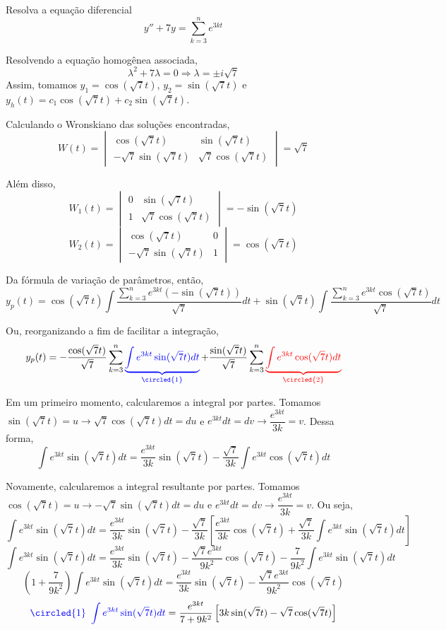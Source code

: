 \documentclass[oneside,12pt,a4paper]{report}
\begin{document}
\exercicio[] Resolva a equação diferencial
\[y''+7y=\sum_{k=3}^{n}e^{3kt}\]

\begin{resolucao}
    Resolvendo a equação homogênea associada,
    \[\lambda^2+7\lambda=0\Rightarrow\lambda=\pm i\sqrt{7}\]
    Assim, tomamos $y_1=\cos(\sqrt{7}t)$, $y_2=\sin(\sqrt{7}t)$ e $y_h(t)=c_1\cos(\sqrt{7}t)+c_2\sin(\sqrt{7}t)$.

    Calculando o Wronskiano das soluções encontradas,
    \[W(t)=\begin{vmatrix}
        \cos(\sqrt{7}t)          & \sin(\sqrt{7}t)\\
        -\sqrt{7}\sin(\sqrt{7}t) & \sqrt{7}\cos(\sqrt{7}t)
    \end{vmatrix}=\sqrt{7}\]

    Além disso,
    \[W_1(t)=\begin{vmatrix}
        0 & \sin(\sqrt{7}t)\\
        1 & \sqrt{7}\cos(\sqrt{7}t)
    \end{vmatrix}=-\sin(\sqrt{7}t)\]
    \[W_2(t)=\begin{vmatrix}
        \cos(\sqrt{7}t)          & 0\\
        -\sqrt{7}\sin(\sqrt{7}t) & 1
    \end{vmatrix}=\cos(\sqrt{7}t)\]

    Da fórmula de variação de parâmetros, então,
    \[ y_p(t)=\cos(\sqrt{7}t)\int\frac{\sum_{k=3}^{n}e^{3kt}(-\sin(\sqrt{7}t))}{\sqrt{7}}dt+\sin(\sqrt{7}t)\int\frac{\sum_{k=3}^{n}e^{3kt}\cos(\sqrt{7}t)}{\sqrt{7}}dt\]

    Ou, reorganizando a fim de facilitar a integração,
    \[ y_p(t)=-\frac{\cos(\sqrt{7}t)}{\sqrt{7}}\sum_{k=3}^{n}\color{blue}\underbrace{\int e^{3kt}\sin(\sqrt{7}t)dt}_{\circled{1}}\color{black}+\frac{\sin(\sqrt{7}t)}{\sqrt{7}}\sum_{k=3}^{n}\color{red}{\underbrace{\int e^{3kt}\cos(\sqrt{7}t)dt}_{\circled{2}}}\]

    Em um primeiro momento, calcularemos a integral  por partes. Tomamos $\sin(\sqrt{7}t)=u\rightarrow\sqrt{7}\cos(\sqrt{7}t)dt=du$ e $e^{3kt}dt=dv\rightarrow\dfrac{e^{3kt}}{3k}=v$. Dessa forma,
    \[\int e^{3kt}\sin(\sqrt{7}t)dt=\frac{e^{3kt}}{3k}\sin(\sqrt{7}t)-\frac{\sqrt{7}}{3k}\int e^{3kt}\cos(\sqrt{7}t)dt\]

    Novamente, calcularemos a integral resultante por partes. Tomamos $\cos(\sqrt{7}t)=u\rightarrow-\sqrt{7}\sin(\sqrt{7}t)dt=du$ e $e^{3kt}dt=dv\rightarrow\dfrac{e^{3kt}}{3k}=v$. Ou seja,
    \[\int e^{3kt}\sin(\sqrt{7}t)dt=\frac{e^{3kt}}{3k}\sin(\sqrt{7}t)-\frac{\sqrt{7}}{3k}\left[\frac{e^{3kt}}{3k}\cos(\sqrt{7}t)+\frac{\sqrt{7}}{3k}\int e^{3kt}\sin(\sqrt{7}t)dt\right]\]
    \[\int e^{3kt}\sin(\sqrt{7}t)dt=\frac{e^{3kt}}{3k}\sin(\sqrt{7}t)-\frac{\sqrt{7}e^{3kt}}{9k^2}\cos(\sqrt{7}t)-\frac{7}{9k^2}\int e^{3kt}\sin(\sqrt{7}t)dt\]
    \[\left(1+\frac{7}{9k^2}\right)\int e^{3kt}\sin(\sqrt{7}t)dt=\frac{e^{3kt}}{3k}\sin(\sqrt{7}t)-\frac{\sqrt{7}e^{3kt}}{9k^2}\cos(\sqrt{7}t)\]
    \[\color{blue}\text{\circled{1} }\int e^{3kt}\sin(\sqrt{7}t)dt\color{black}=\frac{e^{3kt}}{7+9k^2}\left[3k\sin(\sqrt{7}t)-\sqrt{7}\cos(\sqrt{7}t)\right]\]


\end{resolucao}
\end{document}
